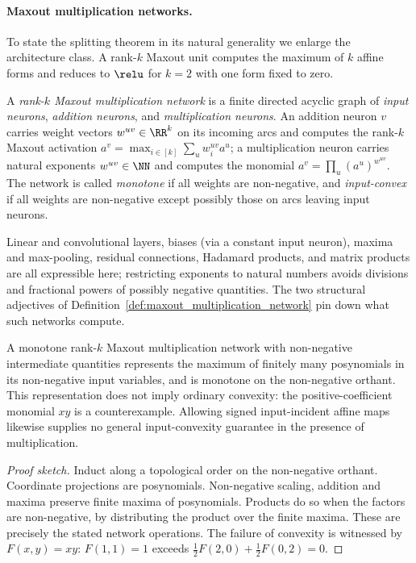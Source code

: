 \paragraph{Maxout multiplication networks.}
To state the splitting theorem in its natural generality we enlarge the architecture class. A rank-$k$ Maxout unit \parencite{Goodfellow2013Maxout} computes the maximum of $k$ affine forms and reduces to $\relu$ for $k = 2$ with one form fixed to zero.

\begin{definition}\label{def:maxout_multiplication_network}
A \emph{rank-$k$ Maxout multiplication network} is a finite directed acyclic graph of \emph{input neurons}, \emph{addition neurons}, and \emph{multiplication neurons}. An addition neuron $v$ carries weight vectors $w^{uv} \in \RR^k$ on its incoming arcs and computes the rank-$k$ Maxout activation $a^v = \max_{i \in [k]} \sum_{u} w^{uv}_i a^u$; a multiplication neuron carries natural exponents $w^{uv} \in \NN$ and computes the monomial $a^v = \prod_{u} (a^u)^{w^{uv}}$. The network is called \emph{monotone} if all weights are non-negative, and \emph{input-convex} if all weights are non-negative except possibly those on arcs leaving input neurons.
\end{definition}

Linear and convolutional layers, biases (via a constant input neuron), maxima and max-pooling, residual connections, Hadamard products, and matrix products are all expressible here; restricting exponents to natural numbers avoids divisions and fractional powers of possibly negative quantities. The two structural adjectives of Definition~\ref{def:maxout_multiplication_network} pin down what such networks compute.

\begin{proposition}\label{prop:posynomial_representation}
A monotone rank-$k$ Maxout multiplication network with non-negative intermediate quantities represents the maximum of finitely many posynomials in its non-negative input variables, and is monotone on the non-negative orthant. This representation does not imply ordinary convexity: the positive-coefficient monomial $xy$ is a counterexample. Allowing signed input-incident affine maps likewise supplies no general input-convexity guarantee in the presence of multiplication.
\hfill{}
\end{proposition}

\begin{proof}[Proof sketch]
Induct along a topological order on the non-negative orthant. Coordinate projections are posynomials. Non-negative scaling, addition and maxima preserve finite maxima of posynomials. Products do so when the factors are non-negative, by distributing the product over the finite maxima. These are precisely the stated network operations. The failure of convexity is witnessed by $F(x,y)=xy$: $F(1,1)=1$ exceeds $\tfrac12F(2,0)+\tfrac12F(0,2)=0$.
\end{proof}

